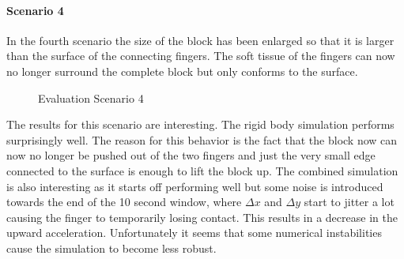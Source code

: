 \clearpage
\paragraph{Scenario 4}
In the fourth scenario the size of the block has been enlarged so that  it is larger than the surface of the connecting fingers. The soft tissue of the fingers can now no longer surround the complete block but only conforms to the surface.

\begin{figure}[htb]
	\centering
	\caption{Evaluation Scenario 4}
\end{figure}

The results for this scenario are interesting. The rigid body simulation performs surprisingly well. The reason for this behavior is the fact that the block now can now no longer be pushed out of the two fingers and just the very small edge connected to the surface is enough to lift the block up. The combined simulation is also interesting as it starts off performing well but some noise is introduced towards the end of the 10 second window, where $\Delta x$ and $\Delta y$ start to jitter a lot causing the finger to temporarily losing contact. This results in a decrease in the upward acceleration. Unfortunately it seems that some numerical instabilities cause the simulation to become less robust.  
